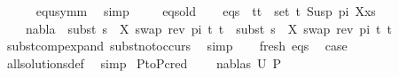 \begin{isabellebody}
\ \ \ \ \isamarkupfalse%
\ equ{\isacharunderscore}{\kern0pt}symm\ \isamarkupfalse%
\ simp\isanewline
\isanewline
\ \ \isamarkupfalse%
\ {}\ eqs{\isacharunderscore}{\kern0pt}old\isanewline
\ \ \isamarkupfalse%
\ eqs{\isacharcolon}{\kern0pt}\ {\isachardoublequoteopen}{\isasymforall}\ {\isacharparenleft}{\kern0pt}t{}{\isacharcomma}{\kern0pt}t{}{\isacharparenright}{\kern0pt}\ {\isasymin}\ set\ {\isacharparenleft}{\kern0pt}{\isacharparenleft}{\kern0pt}t{\isacharprime}{\kern0pt}{\isacharcomma}{\kern0pt}\ Susp\ pi\ X{\isacharparenright}{\kern0pt}{\isacharhash}{\kern0pt}xs{\isacharparenright}{\kern0pt}{\isachardot}{\kern0pt}\ \isanewline
\ \ \ \ nabla{}\ {\isasymturnstile}\ subst\ {\isacharparenleft}{\kern0pt}s{}\ {\isasymbullet}\ {\isacharbrackleft}{\kern0pt}{\isacharparenleft}{\kern0pt}X{\isacharcomma}{\kern0pt}\ swap\ {\isacharparenleft}{\kern0pt}rev\ pi{\isacharparenright}{\kern0pt}\ t{\isacharprime}{\kern0pt}{\isacharparenright}{\kern0pt}{\isacharbrackright}{\kern0pt}{\isacharparenright}{\kern0pt}\ t{}\ {\isasymapprox}\ subst\ {\isacharparenleft}{\kern0pt}s{}\ {\isasymbullet}\ {\isacharbrackleft}{\kern0pt}{\isacharparenleft}{\kern0pt}X{\isacharcomma}{\kern0pt}\ swap\ {\isacharparenleft}{\kern0pt}rev\ pi{\isacharparenright}{\kern0pt}\ t{\isacharprime}{\kern0pt}{\isacharparenright}{\kern0pt}{\isacharbrackright}{\kern0pt}{\isacharparenright}{\kern0pt}\ t{}{\isachardoublequoteclose}\isanewline
\ \ \ \ \isamarkupfalse%
\ subst{\isacharunderscore}{\kern0pt}comp{\isacharunderscore}{\kern0pt}expand\ subst{\isacharunderscore}{\kern0pt}not{\isacharunderscore}{\kern0pt}occurs\ \isamarkupfalse%
\ simp\isanewline
\isanewline
\ \ \isamarkupfalse%
\ fresh\ eqs\ \isamarkupfalse%
\ {\isacharquery}{\kern0pt}case\isanewline
\ \ \ \ \isamarkupfalse%
\ all{\isacharunderscore}{\kern0pt}solutions{\isacharunderscore}{\kern0pt}def\ \isamarkupfalse%
\ simp\isanewline
{}\isamarkupfalse%
%
\endisatagproof
{\isafoldproof}%
%
\isadelimproof
\isanewline
%
\endisadelimproof
\isanewline
\isanewline
{}\isamarkupfalse%
\ P{}{\isacharunderscore}{\kern0pt}to{\isacharunderscore}{\kern0pt}P{}{\isacharunderscore}{\kern0pt}cred{\isacharcolon}{\kern0pt}\ \isanewline
\ \ \ {\isachardoublequoteopen}{\isacharparenleft}{\kern0pt}nabla{}{\isacharcomma}{\kern0pt}s{}{\isacharparenright}{\kern0pt}{\isasymin}\ U\ P{}{\isachardoublequoteclose}\isanewline

\end{isabellebody}
